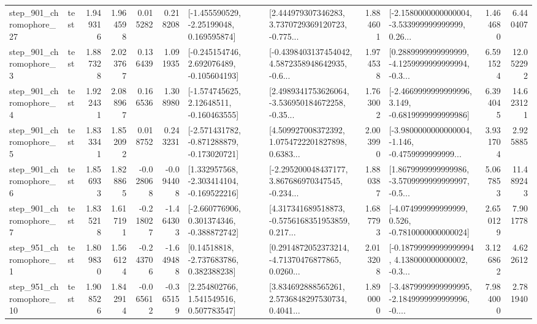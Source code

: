\begin{tabular}{llrrrrllrlrr}
  step\_901\_chromophore\_27 &      test &      1.949316 &    1.964598 &      0.015282 &  0.218208 &    [-1.455590529, -2.25199048, 0.169595874] &  [2.444979307346283, 3.7370729369120723, -0.775... &       1.884601 &  [-2.1580000000000004, -3.533999999999999, 0.26... &            1.464680 &          6.440407 \\
   step\_901\_chromophore\_3 &      test &      1.887328 &    2.023767 &      0.136439 &  1.091935 &   [-0.245154746, 2.692076489, -0.105604193] &  [-0.4398403137454042, 4.5872358948642935, -0.6... &       1.974538 &  [0.2889999999999999, -4.1259999999999994, -0.3... &            6.591524 &         12.052292 \\
   step\_901\_chromophore\_4 &      test &      1.922431 &    2.088967 &      0.166536 &  1.308980 &    [-1.574745625, 2.12648511, -0.160463555] &  [2.4989341753626064, -3.536950184672258, -0.35... &       1.763002 &  [-2.4669999999999996, 3.149, -0.6819999999999986] &            6.394045 &         14.623121 \\
   step\_901\_chromophore\_5 &      test &      1.833341 &    1.852092 &      0.018752 &  0.243231 &  [-2.571431782, -0.871288879, -0.173020721] &  [4.509927008372392, 1.0754722201827898, 0.6383... &       2.003990 &  [-3.9800000000000004, -1.146, -0.4759999999999... &            3.931704 &          2.925885 \\
   step\_901\_chromophore\_6 &      test &      1.856933 &    1.828865 &     -0.028068 & -0.094408 &   [1.332957568, -2.303414104, -0.169522216] &  [-2.295200048437177, 3.867686970347545, -0.234... &       1.880387 &  [1.8679999999999986, -3.5709999999999997, -0.5... &            5.067853 &         11.489243 \\
   step\_901\_chromophore\_7 &      test &      1.835218 &    1.617191 &     -0.218027 & -1.464303 &   [-2.660776906, 0.301374346, -0.388872742] &  [4.317341689518873, -0.5756168351953859, 0.217... &       1.687793 &   [-4.074999999999999, 0.526, -0.7810000000000024] &            2.650129 &          7.901778 \\
   step\_951\_chromophore\_1 &      test &      1.809830 &    1.566124 &     -0.243706 & -1.649488 &     [0.14518818, -2.737683786, 0.382388238] &  [0.2914872052373214, -4.71370476877865, 0.0260... &       2.013208 &  [-0.18799999999999994, 4.138000000000002, -0.3... &            3.126862 &          4.622612 \\
  step\_951\_chromophore\_10 &      test &      1.908526 &    1.842914 &     -0.065612 & -0.365159 &     [2.254802766, 1.541549516, 0.507783547] &  [3.834692888565261, 2.5736848297530734, 0.4041... &       1.890000 &  [-3.4879999999999995, -2.1849999999999996, -0.... &            7.984000 &          2.781940 \\

\end{tabular}
